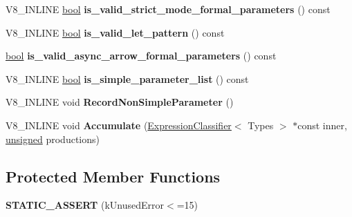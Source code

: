 \begin{DoxyCompactItemize}
V8\+\_\+\+I\+N\+L\+I\+NE \mbox{\hyperlink{classbool}{bool}} {\bfseries is\+\_\+valid\+\_\+strict\+\_\+mode\+\_\+formal\+\_\+parameters} () const
\item 
\mbox{\label{classv8_1_1internal_1_1ExpressionClassifierBase_ae7f0bc25ea8ea4d81f0ee8cf9a35adee}} 
V8\+\_\+\+I\+N\+L\+I\+NE \mbox{\hyperlink{classbool}{bool}} {\bfseries is\+\_\+valid\+\_\+let\+\_\+pattern} () const
\item 
\mbox{\label{classv8_1_1internal_1_1ExpressionClassifierBase_a6e7c05450a6d7c46f7e467a41a5f2c47}} 
\mbox{\hyperlink{classbool}{bool}} {\bfseries is\+\_\+valid\+\_\+async\+\_\+arrow\+\_\+formal\+\_\+parameters} () const
\item 
\mbox{\label{classv8_1_1internal_1_1ExpressionClassifierBase_a9e0c10b18bc963a53d647d98a857f619}} 
V8\+\_\+\+I\+N\+L\+I\+NE \mbox{\hyperlink{classbool}{bool}} {\bfseries is\+\_\+simple\+\_\+parameter\+\_\+list} () const
\item 
\mbox{\label{classv8_1_1internal_1_1ExpressionClassifierBase_ade945ef08224ba25b2b2622fb2cd9a07}} 
V8\+\_\+\+I\+N\+L\+I\+NE void {\bfseries Record\+Non\+Simple\+Parameter} ()
\item 
\mbox{\label{classv8_1_1internal_1_1ExpressionClassifierBase_a5785a89ab537512948a398ff9f2b7b2d}} 
V8\+\_\+\+I\+N\+L\+I\+NE void {\bfseries Accumulate} (\mbox{\hyperlink{classv8_1_1internal_1_1ExpressionClassifier}{Expression\+Classifier}}$<$ Types $>$ $\ast$const inner, \mbox{\hyperlink{classunsigned}{unsigned}} productions)
\end{DoxyCompactItemize}
\subsection*{Protected Member Functions}
\begin{DoxyCompactItemize}
\item 
\mbox{\label{classv8_1_1internal_1_1ExpressionClassifierBase_aa8c4d85b4abeefc863f52e880713cf7b}} 
{\bfseries S\+T\+A\+T\+I\+C\+\_\+\+A\+S\+S\+E\+RT} (k\+Unused\+Error$<$=15)
\end{DoxyCompactItemize}
